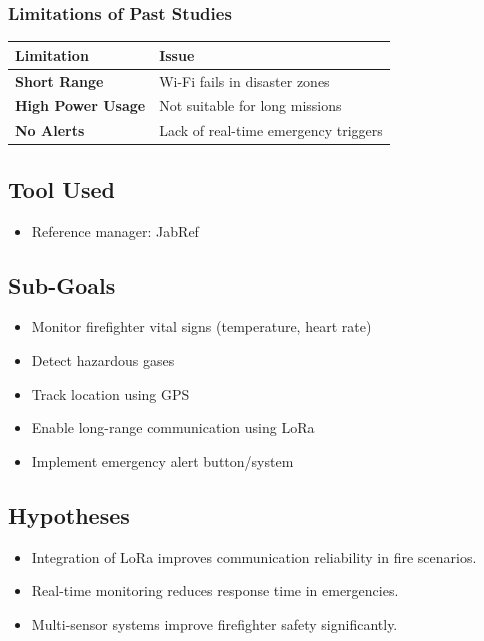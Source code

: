 \documentclass[12pt,a4paper]{article}
\begin{document}
	\subsubsection{Limitations of Past Studies}
	\begin{center}
		\begin{tabular}{>{\bfseries}p{4cm} p{9cm}}
			\toprule
			Limitation & Issue \\
			\midrule
			Short Range & Wi-Fi fails in disaster zones \\
			High Power Usage & Not suitable for long missions \\
			No Alerts & Lack of real-time emergency triggers \\
			\bottomrule
		\end{tabular}
	\end{center}
	
	\subsection{Tool Used}
	\begin{itemize}
		\item Reference manager: JabRef
	\end{itemize}
	
	\subsection{Sub-Goals}
	\begin{itemize}
		\item Monitor firefighter vital signs (temperature, heart rate)
		\item Detect hazardous gases
		\item Track location using GPS
		\item Enable long-range communication using LoRa
		\item Implement emergency alert button/system
	\end{itemize}
	
	\subsection{Hypotheses}
	\begin{itemize}
		\item Integration of LoRa improves communication reliability in fire scenarios.
		\item Real-time monitoring reduces response time in emergencies.
		\item Multi-sensor systems improve firefighter safety significantly.
	\end{itemize}
	
\end{document}
